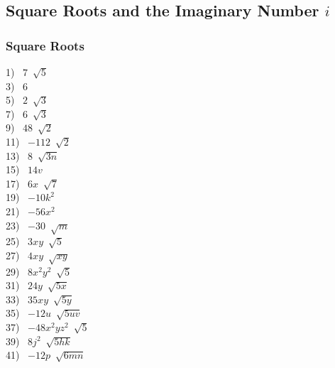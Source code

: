\documentclass[12pt]{book}
\theoremstyle{definition}
\begin{document}
\subsection*{Square Roots and the Imaginary Number $i$}

\subsubsection{Square Roots}


\begin{multicols}{4}
	1)~ $7~\sqrt[]{5}$\\
  3)~ $6$\\
  5)~ $2~\sqrt[]{3}$\\
  7)~ $6~\sqrt[]{3}$\\
  9)~ $48~\sqrt[]{2}$\\
  11)~ $-112~\sqrt[]{2}$\\
  13)~ $8~\sqrt[]{3 n}$\\
  15)~ $14v$\\
  17)~ $6x~\sqrt[]{7}$\\
  19)~ $-10k^2$\\
  21)~ $- 56x^2$\\
  23)~ $- 30~\sqrt[]{m}$\\
  25)~ $3xy~\sqrt[]{5}$\\
  27)~ $4xy~\sqrt[]{xy}$\\
  29)~ $8x^2y^2~\sqrt[]{5}$\\
  31)~ $24y~\sqrt[]{5x}$\\
  33)~ $35xy~\sqrt[]{5y}$\\
  35)~ $- 12u~\sqrt[]{5 u v}$\\
  37)~ $- 48x^2yz^2~\sqrt[]{5}$\\
  39)~ $8 j^2~\sqrt[]{5hk}$\\
  41)~ $- 12p~\sqrt[]{6m n}$%

\end{multicols}
\end{document}
